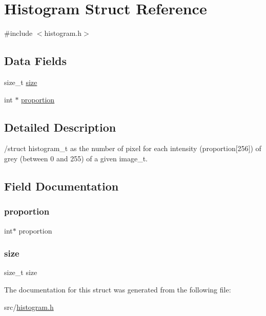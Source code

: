 \hypertarget{struct_histogram}{}\section{Histogram Struct Reference}
\label{struct_histogram}


{\ttfamily \#include $<$histogram.\+h$>$}

\subsection*{Data Fields}
\begin{DoxyCompactItemize}
\item 
size\+\_\+t \mbox{\hyperlink{struct_histogram_a854352f53b148adc24983a58a1866d66}{size}}
\item 
int $\ast$ \mbox{\hyperlink{struct_histogram_a6e6e5ea5592d0fea041f7259007bd17b}{proportion}}
\end{DoxyCompactItemize}


\subsection{Detailed Description}
/struct histogram\+\_\+t as the number of pixel for each intensity (proportion\mbox{[}256\mbox{]}) of grey (between 0 and 255) of a given image\+\_\+t. 

\subsection{Field Documentation}
\mbox{\label{struct_histogram_a6e6e5ea5592d0fea041f7259007bd17b}} 
\subsubsection{\texorpdfstring{proportion}{proportion}}
{\footnotesize\ttfamily int$\ast$ proportion}

\mbox{\label{struct_histogram_a854352f53b148adc24983a58a1866d66}} 
\subsubsection{\texorpdfstring{size}{size}}
{\footnotesize\ttfamily size\+\_\+t size}



The documentation for this struct was generated from the following file\+:\begin{DoxyCompactItemize}
\item 
src/\mbox{\hyperlink{histogram_8h}{histogram.\+h}}\end{DoxyCompactItemize}
